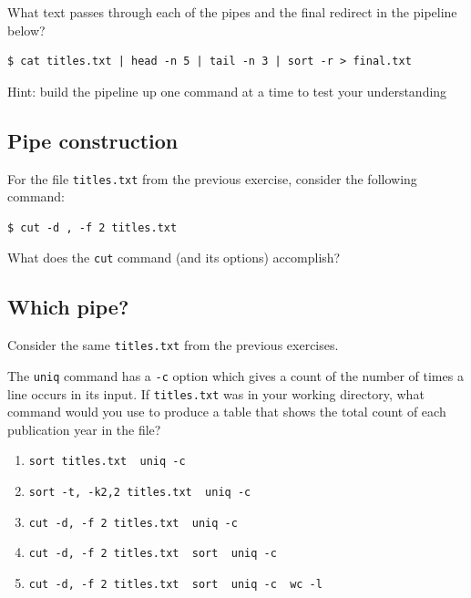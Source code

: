 \documentclass[
]{krantz}
\providecommand{\tightlist}{%
  \setlength{\itemsep}{0pt}\setlength{\parskip}{0pt}}
\begin{document}
What text passes through each of the pipes and the final redirect in the pipeline below?

\begin{verbatim}
$ cat titles.txt | head -n 5 | tail -n 3 | sort -r > final.txt
\end{verbatim}

Hint: build the pipeline up one command at a time to test your understanding

\hypertarget{bash-basics-ex-pipe-construction}{%
\subsection{Pipe construction}\label{bash-basics-ex-pipe-construction}}

For the file \texttt{titles.txt} from the previous exercise, consider the following command:

\begin{verbatim}
$ cut -d , -f 2 titles.txt
\end{verbatim}

What does the \texttt{cut} command (and its options) accomplish?

\hypertarget{bash-basics-ex-which-pipe}{%
\subsection{Which pipe?}\label{bash-basics-ex-which-pipe}}

Consider the same \texttt{titles.txt} from the previous exercises.

The \texttt{uniq} command has a \texttt{-c} option which gives a count of the
number of times a line occurs in its input.
If \texttt{titles.txt} was in your working directory,
what command would you use to produce
a table that shows the total count of each publication year in the file?

\begin{enumerate}
\def\labelenumi{\arabic{enumi}.}
\tightlist
\item
  \texttt{sort\ titles.txt\ \textbar{}\ uniq\ -c}
\item
  \texttt{sort\ -t,\ -k2,2\ titles.txt\ \textbar{}\ uniq\ -c}
\item
  \texttt{cut\ -d,\ -f\ 2\ titles.txt\ \textbar{}\ uniq\ -c}
\item
  \texttt{cut\ -d,\ -f\ 2\ titles.txt\ \textbar{}\ sort\ \textbar{}\ uniq\ -c}
\item
  \texttt{cut\ -d,\ -f\ 2\ titles.txt\ \textbar{}\ sort\ \textbar{}\ uniq\ -c\ \textbar{}\ wc\ -l}
\end{enumerate}
\end{document}
